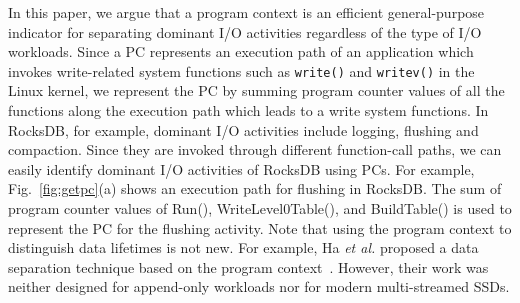 In this paper, 
we argue that a program context 
is an efficient  general-purpose indicator for 
separating dominant I/O activities regardless of the type of I/O workloads. 
Since a PC represents an execution path of an application which invokes 
write-related system functions such as {\tt write()} and {\tt writev()} 
in the Linux kernel,  
we represent the PC by summing program counter values of all the functions 
along the execution path which leads to a write system functions.
In RocksDB, for example, dominant I/O activities include logging, 
flushing and compaction.  
Since they are invoked through different function-call paths, 
we can easily identify dominant I/O activities of RocksDB using PCs. 
For example, Fig.~\ref{fig:getpc}(a) shows an execution path for flushing in RocksDB.  
The sum of program counter values of Run(), WriteLevel0Table(), and BuildTable() is used to 
represent the PC for the flushing activity.
Note that using the program context to distinguish data lifetimes is not new.  
For example, Ha {\it et al.} proposed a data separation 
technique based on the program context~\cite{PCHa}.   
However, their work was neither designed for append-only 
workloads nor for modern multi-streamed SSDs.

